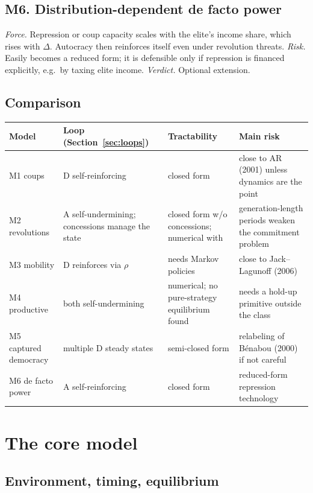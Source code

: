 \documentclass[11pt]{article}
\theoremstyle{remark}
\begin{document}
\subsection{M6. Distribution-dependent de facto power}
\emph{Force.}  Repression or coup capacity scales with the elite's income share, which rises with $\Delta$.  Autocracy then reinforces itself even under revolution threats.  \emph{Risk.}  Easily becomes a reduced form; it is defensible only if repression is financed explicitly, e.g.\ by taxing elite income.  \emph{Verdict.}  Optional extension.

\subsection{Comparison}

\begin{longtable}{p{}p{}p{}p{}}
\toprule
Model & Loop (Section~\ref{sec:loops}) & Tractability & Main risk\\
\midrule
\endhead
M1 coups & D self-reinforcing & closed form & close to AR (2001) unless dynamics are the point\\
M2 revolutions & A self-undermining; concessions manage the state & closed form w/o concessions; numerical with & generation-length periods weaken the commitment problem\\
M3 mobility & D reinforces via $\rho$ & needs Markov policies & close to Jack--Lagunoff (2006)\\
M4 productive & both self-undermining & numerical; no pure-strategy equilibrium found & needs a hold-up primitive outside the class\\
M5 captured democracy & multiple D steady states & semi-closed form & relabeling of B\'enabou (2000) if not careful\\
M6 de facto power & A self-reinforcing & closed form & reduced-form repression technology\\
\bottomrule
\end{longtable}

\section{The core model}\label{sec:core}

\subsection{Environment, timing, equilibrium}
\end{document}
